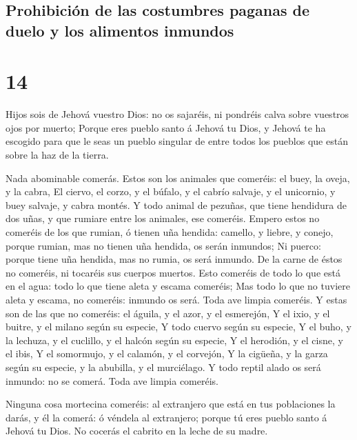 \hypertarget{prohibiciuxf3n-de-las-costumbres-paganas-de-duelo-y-los-alimentos-inmundos}{%
\subsection{Prohibición de las costumbres paganas de duelo y los
alimentos
inmundos}\label{prohibiciuxf3n-de-las-costumbres-paganas-de-duelo-y-los-alimentos-inmundos}}

\hypertarget{section-13}{%
\section{14}\label{section-13}}

 Hijos sois de Jehová vuestro Dios: no os sajaréis, ni
pondréis calva sobre vuestros ojos por muerto;  Porque eres
pueblo santo á Jehová tu Dios, y Jehová te ha escogido para que le seas
un pueblo singular de entre todos los pueblos que están sobre la haz de
la tierra.

 Nada abominable comerás.  Estos son los
animales que comeréis: el buey, la oveja, y la cabra,  El
ciervo, el corzo, y el búfalo, y el cabrío salvaje, y el unicornio, y
buey salvaje, y cabra montés.  Y todo animal de pezuñas, que
tiene hendidura de dos uñas, y que rumiare entre los animales, ese
comeréis.  Empero estos no comeréis de los que rumian, ó
tienen uña hendida: camello, y liebre, y conejo, porque rumian, mas no
tienen uña hendida, os serán inmundos;  Ni puerco: porque
tiene uña hendida, mas no rumia, os será inmundo. De la carne de éstos
no comeréis, ni tocaréis sus cuerpos muertos.  Esto comeréis
de todo lo que está en el agua: todo lo que tiene aleta y escama
comeréis;  Mas todo lo que no tuviere aleta y escama, no
comeréis: inmundo os será.  Toda ave limpia comeréis.
 Y estas son de las que no comeréis: el águila, y el azor,
y el esmerejón,  Y el ixio, y el buitre, y el milano según
su especie,  Y todo cuervo según su especie, 
Y el buho, y la lechuza, y el cuclillo, y el halcón según su especie,
 Y el herodión, y el cisne, y el ibis,  Y el
somormujo, y el calamón, y el corvejón,  Y la cigüeña, y la
garza según su especie, y la abubilla, y el murciélago.  Y
todo reptil alado os será inmundo: no se comerá.  Toda ave
limpia comeréis.

 Ninguna cosa mortecina comeréis: al extranjero que está en
tus poblaciones la darás, y él la comerá: ó véndela al extranjero;
porque tú eres pueblo santo á Jehová tu Dios. No cocerás el cabrito en
la leche de su madre.


